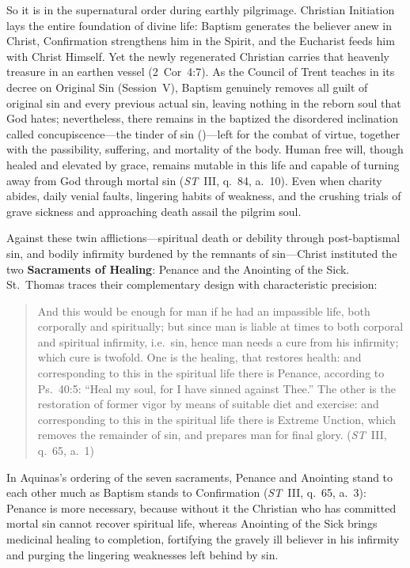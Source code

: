 So it is in the supernatural order during earthly pilgrimage. Christian Initiation lays the entire foundation of divine life: Baptism generates the believer anew in Christ, Confirmation strengthens him in the Spirit, and the Eucharist feeds him with Christ Himself. Yet the newly regenerated Christian carries that heavenly treasure in an earthen vessel (2~Cor~4:7). As the Council of Trent teaches in its decree on Original Sin (Session~V), Baptism genuinely removes all guilt of original sin and every previous actual sin, leaving nothing in the reborn soul that God hates; nevertheless, there remains in the baptized the disordered inclination called concupiscence---the tinder of sin ()---left for the combat of virtue, together with the passibility, suffering, and mortality of the body. Human free will, though healed and elevated by grace, remains mutable in this life and capable of turning away from God through mortal sin (\emph{ST}~III, q.~84, a.~10). Even when charity abides, daily venial faults, lingering habits of weakness, and the crushing trials of grave sickness and approaching death assail the pilgrim soul.

Against these twin afflictions---spiritual death or debility through post-baptismal sin, and bodily infirmity burdened by the remnants of sin---Christ instituted the two \textbf{Sacraments of Healing}: Penance and the Anointing of the Sick. St.~Thomas traces their complementary design with characteristic precision:
\begin{quotation}
And this would be enough for man if he had an impassible life, both corporally and spiritually; but since man is liable at times to both corporal and spiritual infirmity, i.e.\ sin, hence man needs a cure from his infirmity; which cure is twofold. One is the healing, that restores health: and corresponding to this in the spiritual life there is Penance, according to Ps.~40:5: ``Heal my soul, for I have sinned against Thee.'' The other is the restoration of former vigor by means of suitable diet and exercise: and corresponding to this in the spiritual life there is Extreme Unction, which removes the remainder of sin, and prepares man for final glory. (\emph{ST}~III, q.~65, a.~1)
\end{quotation}
In Aquinas's ordering of the seven sacraments, Penance and Anointing stand to each other much as Baptism stands to Confirmation (\emph{ST}~III, q.~65, a.~3): Penance is more necessary, because without it the Christian who has committed mortal sin cannot recover spiritual life, whereas Anointing of the Sick brings medicinal healing to completion, fortifying the gravely ill believer in his infirmity and purging the lingering weaknesses left behind by sin.

